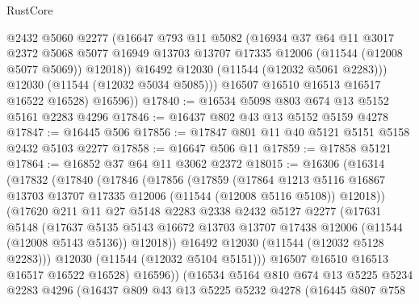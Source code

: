 \begin{lexlean}{RustCore}
\begin{coremodule}
              @2432
              @5060
              @2277
              (@16647
                @793
                @11
                @5082
                (@16934
                  @37
                  @64
                  @11
                  @3017
                  @2372
                  @5068
                  @5077
                  @16949
                  @13703
                  @13707
                  @17335
                  @12006
                  (@11544 (@12008 @5077 @5069))
                  @12018))
              @16492
              @12030
              (@11544 (@12032 @5061 @2283)))
            @12030
            (@11544 (@12032 @5034 @5085)))
          @16507
          @16510
          @16513
          @16517
          @16522
          @16528)
        @16596))
@17840 := @16534 @5098 @803 @674 @13 @5152 @5161 @2283 @4296
@17846 := @16437 @802 @43 @13 @5152 @5159 @4278
@17847 := @16445 @506
@17856 := @17847 @801 @11 @40 @5121 @5151 @5158 @2432 @5103 @2277
@17858 := @16647 @506 @11
@17859 := @17858 @5121
@17864 := @16852 @37 @64 @11 @3062 @2372
@18015 := @16306
    (@16314
      (@17832
        (@17840
          (@17846
            (@17856
              (@17859
                (@17864
                  @1213
                  @5116
                  @16867
                  @13703
                  @13707
                  @17335
                  @12006
                  (@11544 (@12008 @5116 @5108))
                  @12018))
              (@17620
                @211
                @11
                @27
                @5148
                @2283
                @2338
                @2432
                @5127
                @2277
                (@17631
                  @5148
                  (@17637
                    @5135
                    @5143
                    @16672
                    @13703
                    @13707
                    @17438
                    @12006
                    (@11544 (@12008 @5143 @5136))
                    @12018))
                @16492
                @12030
                (@11544 (@12032 @5128 @2283)))
              @12030
              (@11544 (@12032 @5104 @5151)))
            @16507
            @16510
            @16513
            @16517
            @16522
            @16528)
          @16596))
      (@16534
        @5164
        @810
        @674
        @13
        @5225
        @5234
        @2283
        @4296
        (@16437
          @809
          @43
          @13
          @5225
          @5232
          @4278
          (@16445
            @807
            @758

\end{coremodule}
\end{lexlean}
